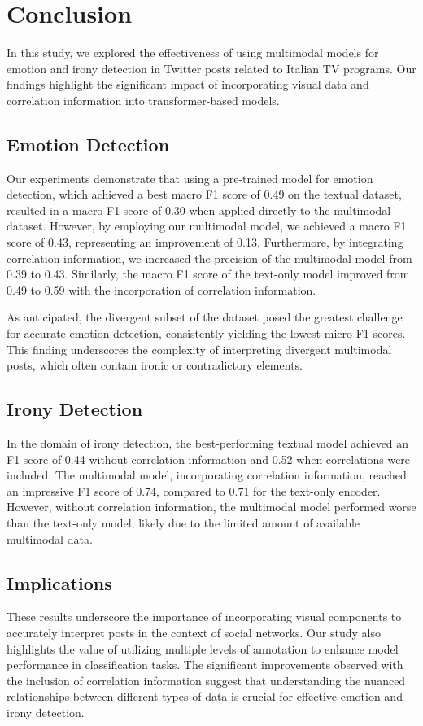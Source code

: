 \documentclass[letterpaper,journal]{IEEEtran}
\begin{document}
\section{Conclusion}
In this study, we explored the effectiveness of using multimodal models for emotion and irony detection in Twitter posts related to Italian TV programs. Our findings highlight the significant impact of incorporating visual data and correlation information into transformer-based models.

\subsection{Emotion Detection}
Our experiments demonstrate that using a pre-trained model for emotion detection, which achieved a best macro F1 score of 0.49 on the textual dataset, resulted in a macro F1 score of 0.30 when applied directly to the multimodal dataset. However, by employing our multimodal model, we achieved a macro F1 score of 0.43, representing an improvement of 0.13. Furthermore, by integrating correlation information, we increased the precision of the multimodal model from 0.39 to 0.43. Similarly, the macro F1 score of the text-only model improved from 0.49 to 0.59 with the incorporation of correlation information.

As anticipated, the divergent subset of the dataset posed the greatest challenge for accurate emotion detection, consistently yielding the lowest micro F1 scores. This finding underscores the complexity of interpreting divergent multimodal posts, which often contain ironic or contradictory elements.

\subsection{Irony Detection}
In the domain of irony detection, the best-performing textual model achieved an F1 score of 0.44 without correlation information and 0.52 when correlations were included. The multimodal model, incorporating correlation information, reached an impressive F1 score of 0.74, compared to 0.71 for the text-only encoder. However, without correlation information, the multimodal model performed worse than the text-only model, likely due to the limited amount of available multimodal data.

\subsection{Implications}
These results underscore the importance of incorporating visual components to accurately interpret posts in the context of social networks. Our study also highlights the value of utilizing multiple levels of annotation to enhance model performance in classification tasks. The significant improvements observed with the inclusion of correlation information suggest that understanding the nuanced relationships between different types of data is crucial for effective emotion and irony detection.
\end{document}
